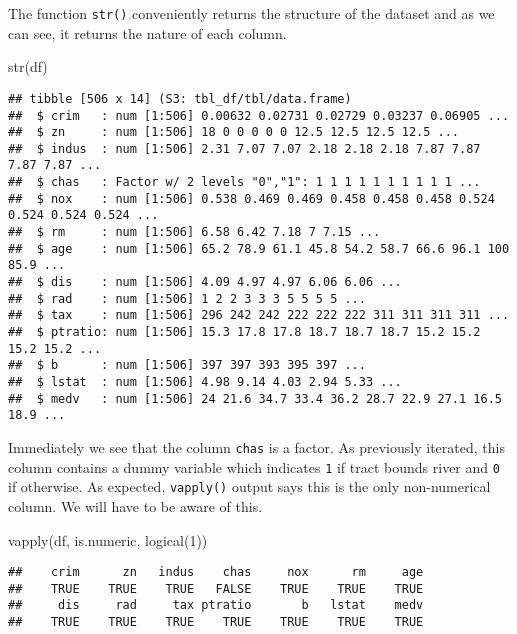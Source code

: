 \documentclass[
]{book}
\newenvironment{Shaded}{\begin{snugshade}}{\end{snugshade}}
\newcommand{\DecValTok}[1]{\textcolor[rgb]{0.00,0.00,0.81}{#1}}
\newcommand{\FunctionTok}[1]{\textcolor[rgb]{0.00,0.00,0.00}{#1}}
\newcommand{\NormalTok}[1]{#1}
\begin{document}
The function \texttt{str()} conveniently returns the structure of the dataset and as we can see, it returns the nature of each column.

\begin{Shaded}
\begin{Highlighting}[]
\FunctionTok{str}\NormalTok{(df)}
\end{Highlighting}
\end{Shaded}

\begin{verbatim}
## tibble [506 x 14] (S3: tbl_df/tbl/data.frame)
##  $ crim   : num [1:506] 0.00632 0.02731 0.02729 0.03237 0.06905 ...
##  $ zn     : num [1:506] 18 0 0 0 0 0 12.5 12.5 12.5 12.5 ...
##  $ indus  : num [1:506] 2.31 7.07 7.07 2.18 2.18 2.18 7.87 7.87 7.87 7.87 ...
##  $ chas   : Factor w/ 2 levels "0","1": 1 1 1 1 1 1 1 1 1 1 ...
##  $ nox    : num [1:506] 0.538 0.469 0.469 0.458 0.458 0.458 0.524 0.524 0.524 0.524 ...
##  $ rm     : num [1:506] 6.58 6.42 7.18 7 7.15 ...
##  $ age    : num [1:506] 65.2 78.9 61.1 45.8 54.2 58.7 66.6 96.1 100 85.9 ...
##  $ dis    : num [1:506] 4.09 4.97 4.97 6.06 6.06 ...
##  $ rad    : num [1:506] 1 2 2 3 3 3 5 5 5 5 ...
##  $ tax    : num [1:506] 296 242 242 222 222 222 311 311 311 311 ...
##  $ ptratio: num [1:506] 15.3 17.8 17.8 18.7 18.7 18.7 15.2 15.2 15.2 15.2 ...
##  $ b      : num [1:506] 397 397 393 395 397 ...
##  $ lstat  : num [1:506] 4.98 9.14 4.03 2.94 5.33 ...
##  $ medv   : num [1:506] 24 21.6 34.7 33.4 36.2 28.7 22.9 27.1 16.5 18.9 ...
\end{verbatim}

Immediately we see that the column \texttt{chas} is a factor. As previously iterated, this column contains a dummy variable which indicates \texttt{1} if tract bounds river and \texttt{0} if otherwise. As expected, \texttt{vapply()} output says this is the only non-numerical column. We will have to be aware of this.

\begin{Shaded}
\begin{Highlighting}[]
\FunctionTok{vapply}\NormalTok{(df, is.numeric, }\FunctionTok{logical}\NormalTok{(}\DecValTok{1}\NormalTok{))}
\end{Highlighting}
\end{Shaded}

\begin{verbatim}
##    crim      zn   indus    chas     nox      rm     age 
##    TRUE    TRUE    TRUE   FALSE    TRUE    TRUE    TRUE 
##     dis     rad     tax ptratio       b   lstat    medv 
##    TRUE    TRUE    TRUE    TRUE    TRUE    TRUE    TRUE
\end{verbatim}
\end{document}

